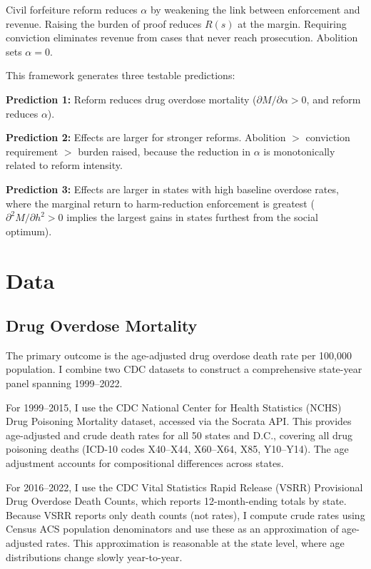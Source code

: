 \documentclass[12pt]{article}
\begin{document}
Civil forfeiture reform reduces $\alpha$ by weakening the link between enforcement and revenue. Raising the burden of proof reduces $R(s)$ at the margin. Requiring conviction eliminates revenue from cases that never reach prosecution. Abolition sets $\alpha = 0$.

This framework generates three testable predictions:

\textbf{Prediction 1:} Reform reduces drug overdose mortality ($\partial M / \partial \alpha > 0$, and reform reduces $\alpha$).

\textbf{Prediction 2:} Effects are larger for stronger reforms. Abolition $>$ conviction requirement $>$ burden raised, because the reduction in $\alpha$ is monotonically related to reform intensity.

\textbf{Prediction 3:} Effects are larger in states with high baseline overdose rates, where the marginal return to harm-reduction enforcement is greatest ($\partial^2 M / \partial h^2 > 0$ implies the largest gains in states furthest from the social optimum).


\section{Data}
\label{sec:data}

\subsection{Drug Overdose Mortality}

The primary outcome is the age-adjusted drug overdose death rate per 100,000 population. I combine two CDC datasets to construct a comprehensive state-year panel spanning 1999--2022.

For 1999--2015, I use the CDC National Center for Health Statistics (NCHS) Drug Poisoning Mortality dataset, accessed via the Socrata API. This provides age-adjusted and crude death rates for all 50 states and D.C., covering all drug poisoning deaths (ICD-10 codes X40--X44, X60--X64, X85, Y10--Y14). The age adjustment accounts for compositional differences across states.

For 2016--2022, I use the CDC Vital Statistics Rapid Release (VSRR) Provisional Drug Overdose Death Counts, which reports 12-month-ending totals by state. Because VSRR reports only death counts (not rates), I compute crude rates using Census ACS population denominators and use these as an approximation of age-adjusted rates. This approximation is reasonable at the state level, where age distributions change slowly year-to-year.
\end{document}
